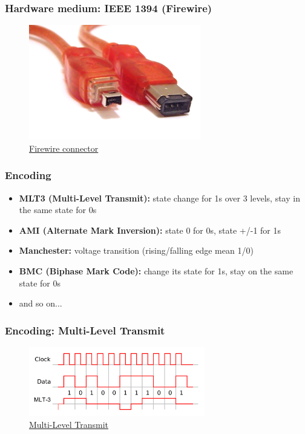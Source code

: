   \begin{frame}
    \frametitle{Hardware medium: IEEE 1394 (Firewire)}
    \begin{figure}[t]
      \centering
      \includegraphics[height=5cm]{./imgs/firewire.jpg}
      \caption{\color{blue}\href{https://upload.wikimedia.org/wikipedia/commons/thumb/f/f7/FireWire_cables.jpg/800px-FireWire_cables.jpg}{Firewire connector}}
      \label{fig:firewire}
    \end{figure}
  \end{frame}
  \begin{frame}
    \frametitle{Encoding}
      \begin{itemize}
        \item \textbf{MLT3 (Multi-Level Transmit):} state change for 1s over 3 levels, stay in the same state for 0s \pause
        \item \textbf{AMI (Alternate Mark Inversion):} state 0 for 0s, state +/-1 for 1s \pause
        \item \textbf{Manchester:} voltage transition (rising/falling edge mean 1/0) \pause
        \item \textbf{BMC (Biphase Mark Code):} change its state for 1s, stay on the same state for 0s \pause
        \item and so on...
      \end{itemize}
  \end{frame}
  \begin{frame}
    \frametitle{Encoding: Multi-Level Transmit}
    \begin{figure}[t]
      \centering
      \includegraphics[height=3cm]{./imgs/mlt3.png}
      \caption{\color{blue}\href{https://upload.wikimedia.org/wikipedia/commons/thumb/b/b4/MLT3encoding.svg/1456px-MLT3encoding.svg.png}{Multi-Level Transmit}}
      \label{fig:mlt3}
    \end{figure}
  \end{frame}
